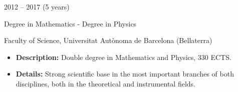 \documentclass[a4paper,10pt]{article}
\newlength{\cvcolumngapwidth}
\newlength{\cvleftcolumnwidth}
\newlength{\cvrightcolumnwidth}
\newcommand{\cvtitlestyle}[1]{{\large\cvtitlefont\textcolor{cvtitlecolor}{#1}}}
\newcommand{\cvdurationstyle}[1]{{\small\cvdurationfont\textcolor{cvdurationcolor}{#1}}}
\newlength{\cvafteritemskipamount}
\newlength{\cvaftertitleskipamount}
\newlength{\cvparskip}
\newcommand{\cvitem}[2]{
    \begin{minipage}[t]{\cvleftcolumnwidth}
        \raggedleft #1
    \end{minipage}%
    \hspace{\cvcolumngapwidth}%
    \begin{minipage}[t]{\cvrightcolumnwidth}
        \setlength{\parskip}{\cvparskip} #2
    \end{minipage}

    \vspace{\cvafteritemskipamount}
}
\newcommand{\cvtitle}[1]{
    \cvtitlestyle{#1}

    \vspace{\cvaftertitleskipamount}
    \vspace{-\cvparskip}
}
\begin{document}
\cvitem{
 \cvdurationstyle{2012 -- 2017 \hspace{80pt} (5 years)}
}{
    \cvtitle{Degree in Mathematics - Degree in Physics} 
    Faculty of Science, Universitat Autònoma de Barcelona (Bellaterra)
    \vspace{5pt}
    \begin{itemize}[leftmargin=*]
        \item \textbf{Description:} Double degree in Mathematics and Physics, 330 ECTS.
        \vspace{3pt}
        \item \textbf{Details:} Strong scientific base in the most important branches of both disciplines, both in the theoretical and instrumental fields. 
        
           
    \end{itemize}
}

\end{document}
